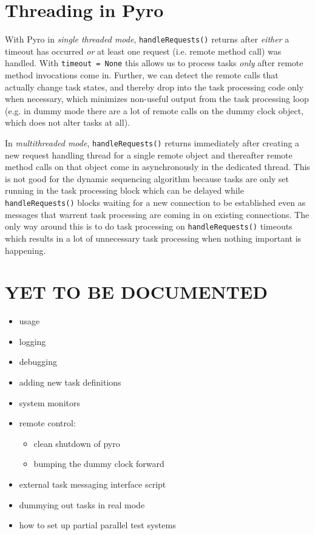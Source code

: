 \documentclass[11pt,a4paper]{article}
\begin{document}
\section{Threading in Pyro} \label{pyro-appendix}

With Pyro in {\em single threaded mode}, \verb#handleRequests()# returns
after {\em either} a timeout has occurred {\em or} at least one request
(i.e.  remote method call) was handled. With \verb#timeout = None# this
allows us to process tasks {\em only} after remote method invocations
come in.  Further, we can detect the remote calls that actually change
task states, and thereby drop into the task processing code only when
necessary, which minimizes non-useful output from the task processing
loop (e.g. in dummy mode there are a lot of remote calls on the dummy
clock object, which does not alter tasks at all). 

In {\em multithreaded mode}, \verb#handleRequests()# returns immediately
after creating a new request handling thread for a single remote object
and thereafter remote method calls on that object come in asynchronously
in the dedicated thread. This is not good for the dynamic sequencing
algorithm because tasks are only set running in the task processing
block which can be delayed while \verb#handleRequests()# blocks waiting
for a new connection to be established even as messages that warrent
task processing are coming in on existing connections. The only way
around this is to do task processing on \verb#handleRequests()# timeouts
which results in a lot of unnecessary task processing when nothing
important is happening.


\section{YET TO BE DOCUMENTED}

\begin{itemize}
 \item usage
 \item logging
 \item debugging
 \item adding new task definitions
 \item system monitors
 \item remote control: 
    \begin{itemize}
    \item clean shutdown of pyro
    \item bumping the dummy clock forward
    \end{itemize}
 \item external task messaging interface script
 \item dummying out tasks in real mode
 \item how to set up partial parallel test systems
\end{itemize}
\end{document}
